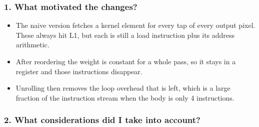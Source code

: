 \documentclass[
  10pt,
]{article}
\providecommand{\tightlist}{%
  \setlength{\itemsep}{0pt}\setlength{\parskip}{0pt}}
\begin{document}
\subsubsection{1. What motivated the
changes?}\label{what-motivated-the-changes}

\begin{itemize}
\tightlist
\item
  The naive version fetches a kernel element for every tap of every
  output pixel. These always hit L1, but each is still a load instruction
  plus its address arithmetic.
\item
  After reordering the weight is constant for a whole pass, so it stays
  in a register and those instructions disappear.
\item
  Unrolling then removes the loop overhead that is left, which is a large
  fraction of the instruction stream when the body is only 4
  instructions.
\end{itemize}

\subsubsection{2. What considerations did I take into
account?}\label{what-considerations-did-i-take-into-account}
\end{document}
